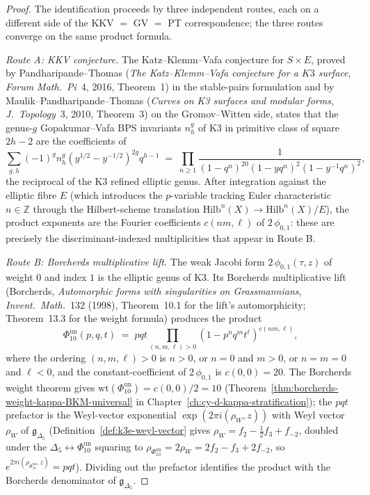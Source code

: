 \begin{proof}
The identification proceeds by three independent routes, each on a
different side of the KKV $=$ GV $=$ PT correspondence; the three
routes converge on the same product formula.

\emph{Route A: KKV conjecture.} The Katz--Klemm--Vafa conjecture for
$S \times E$, proved by Pandharipande--Thomas (\emph{The Katz--Klemm--Vafa
conjecture for a $K3$ surface}, \emph{Forum Math.\ Pi}~4, 2016,
Theorem~1) in the stable-pairs formulation and by Maulik--Pandharipande--Thomas
(\emph{Curves on K3 surfaces and modular forms}, \emph{J.\ Topology}~3,
2010, Theorem~3) on the Gromov--Witten side, states that the
genus-$g$ Gopakumar--Vafa BPS invariants $n^g_h$ of K3 in primitive
class of square $2h - 2$ are the coefficients of
\[
 \sum_{g, h} (-1)^g n^g_h (y^{1/2} - y^{-1/2})^{2g} q^{h-1}
 \;=\;
 \prod_{n \geq 1} \frac{1}{(1 - q^n)^{20} (1 - y q^n)^2 (1 - y^{-1} q^n)^2},
\]
the reciprocal of the K3 refined elliptic genus. After integration
against the elliptic fibre $E$ (which introduces the $p$-variable
tracking Euler characteristic $n \in \mathbb{Z}$ through the
Hilbert-scheme translation $\mathrm{Hilb}^n(X) \to \mathrm{Hilb}^n(X)/E$),
the product exponents are the Fourier coefficients $c(nm, \ell)$
of $2\,\phi_{0,1}$: these are precisely the discriminant-indexed
multiplicities that appear in Route B.

\emph{Route B: Borcherds multiplicative lift.} The weak Jacobi form
$2\,\phi_{0,1}(\tau, z)$ of weight $0$ and index $1$ is the elliptic
genus of K3. Its Borcherds multiplicative lift
(Borcherds, \emph{Automorphic forms with singularities on Grassmannians},
\emph{Invent.\ Math.}~132 (1998), Theorem~10.1 for the lift's
automorphicity; Theorem~13.3 for the weight formula) produces the
product
\[
 \Phi_{10}^{\mathrm{un}}(p, q, t)
 \;=\;
 p q t \prod_{(n,m,\ell) > 0} (1 - p^n q^m t^\ell)^{c(nm, \ell)},
\]
where the ordering $(n,m,\ell) > 0$ is $n > 0$, or $n = 0$ and $m > 0$,
or $n = m = 0$ and $\ell < 0$, and the constant-coefficient of
$2\,\phi_{0,1}$ is $c(0,0) = 20$. The Borcherds weight theorem gives
$\mathrm{wt}(\Phi_{10}^{\mathrm{un}}) = c(0,0)/2 = 10$
(Theorem~\ref{thm:borcherds-weight-kappa-BKM-universal} in
Chapter~\ref{ch:cy-d-kappa-stratification}); the $pqt$ prefactor is
the Weyl-vector exponential $\exp(2\pi i (\rho_W, z))$ with Weyl vector
$\rho_W$ of $\mathfrak{g}_{\Delta_5}$ (Definition~\ref{def:k3e-weyl-vector}
gives $\rho_W = f_2 - \frac{1}{2} f_3 + f_{-2}$, doubled under the
\(\Delta_5 \leftrightarrow \Phi_{10}^{\mathrm{un}}\) squaring to
$\rho_{\Phi_{10}^{\mathrm{un}}} = 2\rho_W = 2f_2 - f_3 + 2f_{-2}$, so
$e^{2\pi i(\rho_{\Phi_{10}^{\mathrm{un}}}, z)} = pqt$). Dividing out the prefactor
identifies the product with the Borcherds denominator of
$\mathfrak{g}_{\Delta_5}$.


\end{proof}
